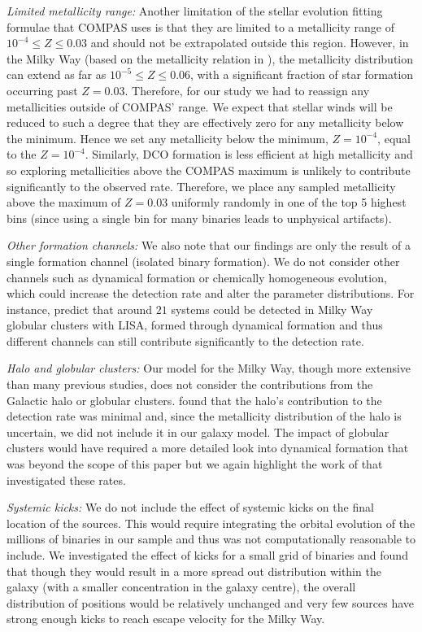 \textit{Limited metallicity range:} Another limitation of the stellar evolution fitting formulae that COMPAS uses is that they are limited to a metallicity range of $10^{-4} \le Z \le 0.03$ and should not be extrapolated outside this region. However, in the Milky Way (based on the metallicity relation in \citet{Frankel+2018}), the metallicity distribution can extend as far as $10^{-5} \le Z \le 0.06$, with a significant fraction of star formation occurring past $Z = 0.03$. Therefore, for our study we had to reassign any metallicities outside of COMPAS' range. We expect that stellar winds will be reduced to such a degree that they are effectively zero for any metallicity below the minimum. Hence we set any metallicity below the minimum, $Z = 10^{-4}$, equal to the $Z = 10^{-4}$. Similarly, DCO formation is less efficient at high metallicity \citep[e.g.][]{Broekgaarden+2021} and so exploring metallicities above the COMPAS maximum is unlikely to contribute significantly to the observed rate. Therefore, we place any sampled metallicity above the maximum of $Z = 0.03$ uniformly randomly in one of the top 5 highest bins (since using a single bin for many binaries leads to unphysical artifacts).

\textit{Other formation channels:} We also note that our findings are only the result of a single formation channel (isolated binary formation). We do not consider other channels such as dynamical formation or chemically homogeneous evolution, which could increase the detection rate and alter the parameter distributions. For instance, \citet{Kremer+2018} predict that around $21$ systems could be detected in Milky Way globular clusters with LISA, formed through dynamical formation and thus different channels can still contribute significantly to the detection rate.

\textit{Halo and globular clusters:} Our model for the Milky Way, though more extensive than many previous studies, does not consider the contributions from the Galactic halo or globular clusters. \citet{Lamberts+2018} found that the halo's contribution to the detection rate was minimal and, since the metallicity distribution of the halo is uncertain, we did not include it in our galaxy model. The impact of globular clusters would have required a more detailed look into dynamical formation that was beyond the scope of this paper but we again highlight the work of \citet{Kremer+2018} that investigated these rates. 

\textit{Systemic kicks:} We do not include the effect of systemic kicks on the final location of the sources. This would require integrating the orbital evolution of the millions of binaries in our sample and thus was not computationally reasonable to include. We investigated the effect of kicks for a small grid of binaries and found that though they would result in a more spread out distribution within the galaxy (with a smaller concentration in the galaxy centre), the overall distribution of positions would be relatively unchanged and very few sources have strong enough kicks to reach escape velocity for the Milky Way.

